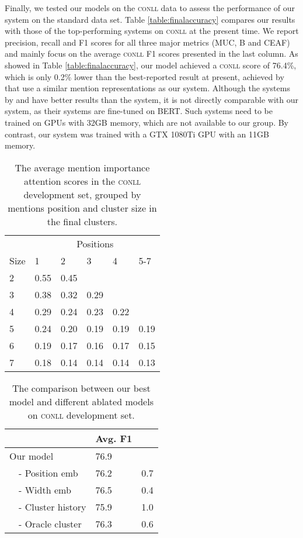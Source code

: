 \documentclass[10pt, a4paper]{article}
\newcommand{\ACRO}[1]{\textsc{#1}}
\newcommand{\CONLL}{\ACRO{conll}}
\begin{document}
Finally, we tested our models on 
the {\CONLL} data to assess the performance of our system on the standard data set. 
Table \ref{table:finalaccuracy} compares our results with those of the top-performing systems on {\CONLL} at the present time. 
We report precision, recall and F1 scores for all three major metrics (MUC, B and CEAF) and mainly focus on the average {\CONLL} F1 scores presented in the last column. As showed in Table \ref{table:finalaccuracy}, our model achieved a {\CONLL} score of 76.4\%, which is only 0.2\% lower than the best-reported result at present, 
achieved by 
\cite{kantor2019bertee} that use a similar mention representations as 
our system. 
Although the systems by  and  have better results than the  system, it is not directly comparable with our system, as their systems are fine-tuned on BERT. 
Such systems need to be trained on GPUs with 32GB memory, which are not available to our group. 
By contrast, our system was trained with 
a GTX 1080Ti GPU with an 11GB memory. 







\begin{table}[t]
\centering
\small
\begin{tabular}{llllll}
\toprule
&\multicolumn{5}{c}{Positions}\\\cmidrule{2-6}
Size&1&2&3&4&5-7\\\midrule
2&0.55&0.45\\ 
3&0.38&0.32&0.29\\
4&0.29&0.24&0.23&0.22\\
5&0.24&0.20&0.19&0.19&0.19\\
6&0.19&0.17&0.16&0.17&0.15\\
7&0.18&0.14&0.14&0.14&0.13\\
\bottomrule
\end{tabular}
\caption{\label{table:cluster_att_eval} The average mention importance attention scores in the {\CONLL} development set, grouped by  mentions position and cluster size in the final clusters. }
\end{table}


\begin{table}[t]
\centering
\small
\begin{tabular}{l l l}
\toprule
&Avg. F1& \\
\midrule
Our model&76.9&\\
\ \ - Position emb&76.2&0.7\\
\ \ - Width emb&76.5&0.4\\
\ \ - Cluster history&75.9&1.0\\
\ \ - Oracle cluster&76.3&0.6\\
\bottomrule
\end{tabular}
\caption{\label{table:analysis} The comparison between our best model and different ablated models on {\CONLL} development set.}
\end{table}
\end{document}
